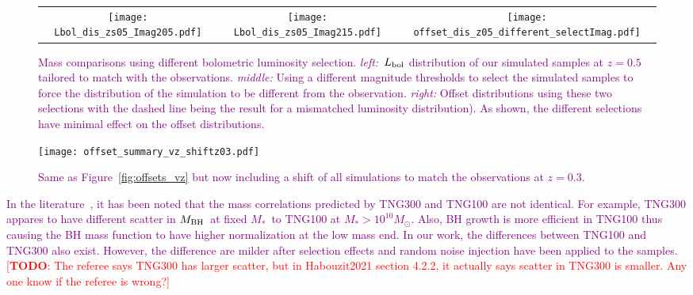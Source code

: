 \documentclass[twocolumn]{aastex631}
\newcommand{\todo}[1]{\textcolor{red}{[{\bf TODO}: #1]}}
\newcommand{\red}[1]{\textcolor{purple}{#1}}
\def\smass{{$M_*$}}
\def\mbh{$M_{\rm BH}$}
\begin{document}
\begin{figure*}
\centering
\begin{tabular}{c c c}
\hspace*{-0.4cm} 
{\texttt{[image: Lbol\_dis\_zs05\_Imag205.pdf]}}&
\hspace*{-0.4cm} 
{\texttt{[image: Lbol\_dis\_zs05\_Imag215.pdf]}}&
\hspace*{-0.4cm} 
{\texttt{[image: offset\_dis\_z05\_different\_selectImag.pdf]}}\\
\end{tabular}
\caption{\label{fig:offsets_nochange} 
\red{Mass comparisons using different bolometric luminosity selection. {\it left:}~$L_{\rm bol}$ distribution of our simulated samples at $z=0.5$ tailored to match with the observations. {\it middle:} Using a different magnitude thresholds to select the simulated samples to force the distribution of the simulation to be different from the observation.  {\it right:} Offset distributions using these two selections with the dashed line being the result for a mismatched luminosity distribution). As shown, the different selections have minimal effect on the offset distributions.}
}
\end{figure*} 


\begin{figure}
\centering
\texttt{[image: offset\_summary\_vz\_shiftz03.pdf]}
\caption{\label{fig:offsets_vz_shiftz03} 
\red{Same as Figure~\ref{fig:offsets_vz} but now including a shift of all simulations to match the observations at $z=0.3$.}
}
\end{figure} 

\red{In the literature~\citep{Weinberger2018, Habouzit2021}, it has been noted that the mass correlations predicted by TNG300 and TNG100 are not identical. For example, TNG300 appares to have different scatter in \mbh\ at fixed \smass\ to TNG100 at \smass $>10^{10}M_{\odot}$. Also, BH growth is more efficient in TNG100 thus causing the BH mass function to have higher normalization at the low mass end. In our work, the differences between TNG100 and TNG300 also exist. However, the difference are milder after selection effects and random noise injection have been applied to the samples.} \todo{The referee says TNG300 has larger scatter, but in Habouzit2021 section 4.2.2, it actually says scatter in TNG300 is smaller. Any one know if the referee is wrong?}
\end{document}
